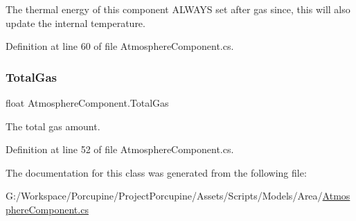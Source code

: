 The thermal energy of this component A\+L\+W\+A\+YS set after gas since, this will also update the internal temperature. 



Definition at line 60 of file Atmosphere\+Component.\+cs.

\mbox{\label{class_atmosphere_component_a36f398bb1cc5031be7309cc06de32ad0}} 
\subsubsection{\texorpdfstring{Total\+Gas}{TotalGas}}
{\footnotesize\ttfamily float Atmosphere\+Component.\+Total\+Gas\hspace{0.3cm}{\ttfamily [get]}}



The total gas amount. 



Definition at line 52 of file Atmosphere\+Component.\+cs.



The documentation for this class was generated from the following file\+:\begin{DoxyCompactItemize}
\item 
G\+:/\+Workspace/\+Porcupine/\+Project\+Porcupine/\+Assets/\+Scripts/\+Models/\+Area/\hyperlink{_atmosphere_component_8cs}{Atmosphere\+Component.\+cs}\end{DoxyCompactItemize}
